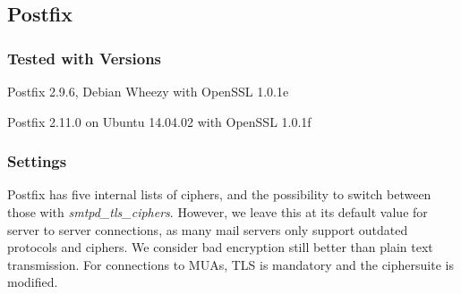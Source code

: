 \subsection{Postfix}

\subsubsection{Tested with Versions}
\begin{itemize*}
  \item Postfix 2.9.6, Debian Wheezy with OpenSSL 1.0.1e
  \item Postfix 2.11.0 on Ubuntu 14.04.02 with OpenSSL 1.0.1f
\end{itemize*}


\subsubsection{Settings}

Postfix has five internal lists of ciphers, and the possibility to switch
between those with \emph{smtpd\_tls\_ciphers}. However, we leave this at its
default value for server to server connections, as many mail servers only
support outdated protocols and ciphers. We consider bad encryption still better
than plain text transmission. For connections to MUAs, TLS is mandatory and the
ciphersuite is modified.




